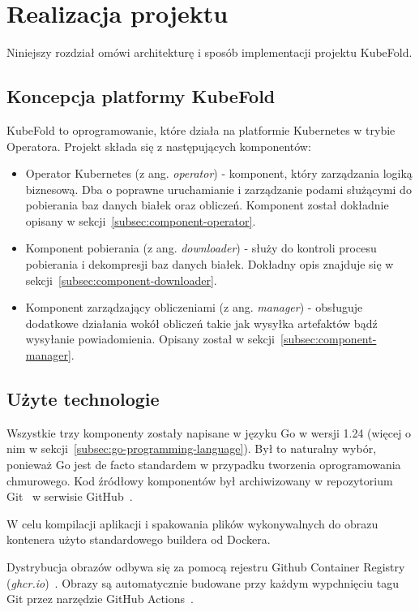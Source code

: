 \chapter{Realizacja projektu}
Niniejszy rozdział omówi architekturę i sposób implementacji projektu KubeFold.


\section{Koncepcja platformy KubeFold}
KubeFold to oprogramowanie, które działa na platformie Kubernetes w trybie Operatora.
Projekt składa się z następujących komponentów:
\begin{itemize}
    \item Operator Kubernetes (z ang. \textit{operator}) - komponent, który zarządzania logiką biznesową.
    Dba o poprawne uruchamianie i zarządzanie podami służącymi do pobierania baz danych białek oraz obliczeń.
    Komponent został dokładnie opisany w sekcji~\ref{subsec:component-operator}.
    \item Komponent pobierania (z ang. \textit{downloader}) - służy do kontroli procesu pobierania i dekompresji baz danych białek.
    Dokładny opis znajduje się w sekcji~\ref{subsec:component-downloader}.
    \item Komponent zarządzający obliczeniami (z ang. \textit{manager}) - obsługuje dodatkowe działania wokół obliczeń takie jak wysyłka artefaktów bądź wysyłanie powiadomienia.
    Opisany został w sekcji~\ref{subsec:component-manager}.
\end{itemize}


\section{Użyte technologie}
Wszystkie trzy komponenty zostały napisane w języku Go w wersji 1.24 (więcej o nim w sekcji~\ref{subsec:go-programming-language}).
Był to naturalny wybór, ponieważ Go jest de facto standardem w przypadku tworzenia oprogramowania chmurowego.
Kod źródłowy komponentów był archiwizowany w repozytorium Git~\cite{git} w serwisie GitHub~\cite{github}.

W celu kompilacji aplikacji i spakowania plików wykonywalnych do obrazu kontenera użyto standardowego buildera od Dockera.

Dystrybucja obrazów odbywa się za pomocą rejestru Github Container Registry (\textit{ghcr.io})~\cite{ghcr}.
Obrazy są automatycznie budowane przy każdym wypchnięciu tagu Git przez narzędzie GitHub Actions~\cite{github_actions}.

